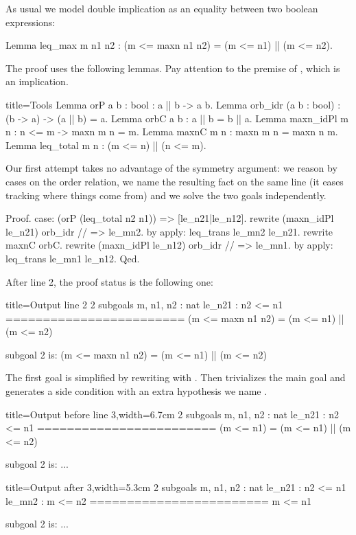 As usual we model double implication as an equality between two
boolean expressions:

\begin{coq}{}{}
Lemma leq_max m n1 n2 : (m <= maxn n1 n2) = (m <= n1) || (m <= n2).
\end{coq}

The proof uses the following lemmas.  Pay attention to the premise of
, which is an implication.

\begin{coq}{}{title=Tools}
Lemma orP {a b : bool} : a || b -> a \/ b.
Lemma orb_idr (a b : bool) : (b -> a) -> (a || b) = a.
Lemma orbC a b : a || b = b || a.
Lemma maxn_idPl {m n} : n <= m -> maxn m n = m.
Lemma maxnC m n : maxn m n = maxn n m.
Lemma leq_total m n : (m <= n) || (n <= m).
\end{coq}

Our first attempt takes no advantage of the symmetry argument:
we reason by cases on the order relation,
we name the resulting fact on the same line
(it eases tracking where things come from) and we solve the two
goals independently.

\begin{coq}{}{}
Proof.
case: (orP (leq_total n2 n1)) => [le_n21|le_n12].
  rewrite (maxn_idPl le_n21) orb_idr // => le_mn2.
  by apply: leq_trans le_mn2 le_n21.
rewrite maxnC orbC.
rewrite (maxn_idPl le_n12) orb_idr // => le_mn1.
by apply: leq_trans le_mn1 le_n12.
Qed.
\end{coq}

After line 2, the proof status is the following one:

\begin{coqout}{}{title=Output line 2}
2 subgoals
m, n1, n2 : nat
le_n21 : n2 <= n1
========================
(m <= maxn n1 n2) = (m <= n1) || (m <= n2)

subgoal 2 is:
(m <= maxn n1 n2) = (m <= n1) || (m <= n2)
\end{coqout}

The first goal is simplified by
rewriting with . %
Then  trivializes the main goal and generates a side condition with
an extra hypothesis we name .

\begin{coqout}{}{title=Output before line 3,width=6.7cm}
2 subgoals
m, n1, n2 : nat
le_n21 : n2 <= n1
========================
(m <= n1) = (m <= n1) || (m <= n2)

subgoal 2 is: ...
\end{coqout}
\begin{coqout}{}{title=Output after 3,width=5.3cm}
2 subgoals
m, n1, n2 : nat
le_n21 : n2 <= n1
le_mn2 : m <= n2
========================
m <= n1

subgoal 2 is: ...
\end{coqout}

